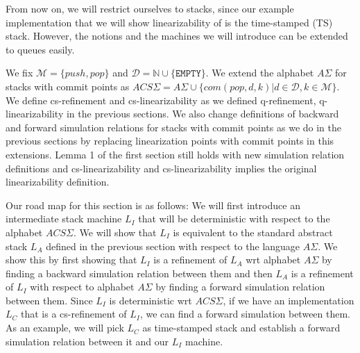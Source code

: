 From now on, we will restrict ourselves to stacks, since our example implementation that we will show linearizability of is the time-stamped (TS) stack. However, the notions and the machines we will introduce can be extended to queues easily. 

We fix $\mathcal{M} = \{push, pop\}$ and $\mathcal{D} = \mathbb{N} \cup \{\texttt{EMPTY}\}$. We extend the alphabet $A\Sigma$ for stacks with commit points as $ACS\Sigma = A\Sigma \cup \{com(pop,d,k)|d \in \mathcal{D}, k \in \mathcal{M}\}$. We define cs-refinement and cs-linearizability as we defined q-refinement, q-linearizability in the previous sections. We also change definitions of backward and forward simulation relations for stacks with commit points as we do in the previous sections by replacing linearization points with commit points in this extensions. Lemma 1 of the first section still holds with new simulation relation definitions and cs-linearizability and cs-linearizability implies the original linearizability definition. 

Our road map for this section is as follows: We will first introduce an intermediate stack machine $L_I$ that will be deterministic with respect to the alphabet $ACS\Sigma$. We will show that $L_I$ is equivalent to the standard abstract stack $L_A$ defined in the previous section with respect to the language $A\Sigma$. We show this by first showing that $L_I$ is a refinement of $L_A$ wrt alphabet $A\Sigma$ by finding a backward simulation relation between them and then $L_A$ is a refinement of $L_I$ with respect to alphabet $A\Sigma$ by finding a forward simulation relation between them. Since $L_I$ is deterministic wrt $ACS\Sigma$, if we have an implementation $L_C$ that is a cs-refinement of $L_I$, we can find a forward simulation between them. As an example, we will pick $L_C$ as time-stamped stack and establish a forward simulation relation between it and our $L_I$ machine. 

